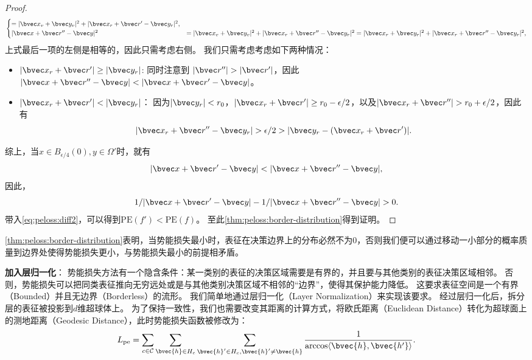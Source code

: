 \begin{proof}
\begin{equation}
\begin{cases}
     = |\bvec x_v + \bvec y_v|^2 + |\bvec x_r + \bvec r' - \bvec y_r|^2, \\
    |\bvec x + \bvec r'' - \bvec y|^2 & = |\bvec x_v + \bvec y_v|^2 + |\bvec x_r + \bvec r'' - \bvec y_r|^2
    = |\bvec x_r + \bvec y_r|^2 + |\bvec x_r + \bvec r'' - \bvec y_r|^2,
\end{cases}
\end{equation}
上式最后一项的左侧是相等的，因此只需考虑右侧。
我们只需考虑考虑如下两种情况：
\begin{itemize}
    \item $|\bvec x_r + \bvec r'| \ge |\bvec y_r|$: 
    同时注意到 $|\bvec r''| > |\bvec r'|$，因此$|\bvec x + \bvec r'' - \bvec y| < |\bvec x + \bvec r' - \bvec y|$。
    \item $|\bvec x_r + \bvec r'| < |\bvec y_r|$：
    因为$|\bvec y_r| < r_0$，$|\bvec x_r + \bvec r'| \ge r_0 - \epsilon / 2$，以及$|\bvec x_r + \bvec r''| > r_0 + \epsilon / 2$，因此有
    \begin{equation}
        |\bvec x_r + \bvec r'' - \bvec y_r| > \epsilon / 2 > |\bvec y_r - (\bvec x_r + \bvec r')|.
    \end{equation}
\end{itemize}
综上，当$x \in B_{\epsilon/4}(0), y \in \Omega'$时，就有
\begin{equation}
    |\bvec x + \bvec r' - \bvec y| < |\bvec x + \bvec r'' - \bvec y|,
\end{equation}
因此，
\begin{equation}
    1 / |\bvec x + \bvec r' - \bvec y| - 1 / |\bvec x + \bvec r'' - \bvec y| > 0.
\end{equation}
带入\autoref{eq:peloss:diff2}，可以得到$\text{PE}(f') < \text{PE}(f)$。
至此\autoref{thm:peloss:border-distribution}得到证明。
\end{proof}

\autoref{thm:peloss:border-distribution}表明，当势能损失最小时，表征在决策边界上的分布必然不为0，否则我们便可以通过移动一小部分的概率质量到边界处使得势能损失更小，与势能损失最小的前提相矛盾。

\textbf{加入层归一化}：
势能损失方法有一个隐含条件：某一类别的表征的决策区域需要是有界的，并且要与其他类别的表征决策区域相邻。
否则，势能损失可以把同类表征推向无穷远处或是与其他类别决策区域不相邻的“边界”，使得其保护能力降低。
%
这要求表征空间是一个有界（Bounded）并且无边界（Borderless）的流形。
%
我们简单地通过层归一化（Layer Normalization）来实现该要求。
%
经过层归一化后，拆分层的表征被投影到$d$维超球体上。
%
为了保持一致性，我们也需要改变其距离的计算方式，将欧氏距离（Euclidean Distance）转化为超球面上的测地距离（Geodesic Distance），此时势能损失函数被修改为：
\begin{equation}
    L_\text{pe} = \sum\limits_{c\in\mathcal C}\sum\limits_{\bvec{h} \in H_c}\sum\limits_{\bvec{h}' \in H_c, \bvec{h}' \ne \bvec{h}} \dfrac{1}{\arccos \langle \bvec{h}, \bvec{h'} \rangle}.
\end{equation}

